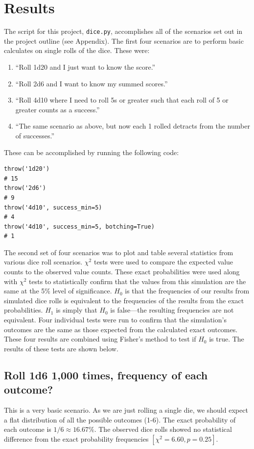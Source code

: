 \documentclass{article}
\begin{document}
\section{Results}
The script for this project, \texttt{dice.py}, accomplishes all of the scenarios set out in the project outline (see Appendix). The first four scenarios are to perform basic calculates on single rolls of the dice. These were:
\begin{enumerate}
\itemsep-.25em
\item ``Roll 1d20 and I just want to know the score.''
\item ``Roll 2d6 and I want to know my summed scores.''
\item ``Roll 4d10 where I need to roll 5s or greater such that each roll of 5 or greater counts as a success.''
\item ``The same scenario as above, but now each 1 rolled detracts from the number of successes.''
\end{enumerate}
\noindent These can be accomplished by running the following code:
\begin{lstlisting}
throw('1d20')
# 15
throw('2d6')
# 9
throw('4d10', success_min=5)
# 4
throw('4d10', success_min=5, botching=True)
# 1
\end{lstlisting}
The second set of four scenarios was to plot and table several statistics from various dice roll scenarios. $\chi^2$ tests were used to compare the expected value counts to the observed value counts. These exact probabilities were used along with $\chi^2$ tests to statistically confirm that the values from this simulation are the same at the 5\% level of significance. $H_0$ is that the frequencies of our results from simulated dice rolls is equivalent to the frequencies of the results from the exact probabilities. $H_1$ is simply that $H_0$ is false---the resulting frequencies are not equivalent. Four individual tests were run to confirm that the simulation's outcomes are the same as those expected from the calculated exact outcomes. These four results are combined using Fisher's method to test if $H_0$ is true. The results of these tests are shown below.

\subsection{Roll 1d6 1,000 times, frequency of each outcome?}
This is a very basic scenario. As we are just rolling a single die, we should expect a flat distribution of all the possible outcomes (1-6). The exact probability of each outcome is $1/6 \approx 16.67\%$. The observed dice rolls showed no statistical difference from the exact probability frequencies $[\chi^2=6.60, p=0.25]$.
\end{document}
